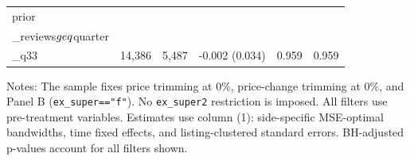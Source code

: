 \begin{table}[!htbp]
\begin{tabular}{lrrrrr}
prior\\_reviews$\\geq$quarter\\_q33 & 14,386 & 5,487 & -0.002 (0.034) & 0.959 & 0.959 \\
\bottomrule
\end{tabular}
\begin{minipage}{0.98\textwidth}\footnotesize
Notes: The sample fixes price trimming at 0\%, price-change trimming at 0\%, and Panel B (\texttt{ex\_super=="f"}). No \texttt{ex\_super2} restriction is imposed. All filters use pre-treatment variables. Estimates use column (1): side-specific MSE-optimal bandwidths, time fixed effects, and listing-clustered standard errors. BH-adjusted p-values account for all filters shown.
\end{minipage}
\end{table}
